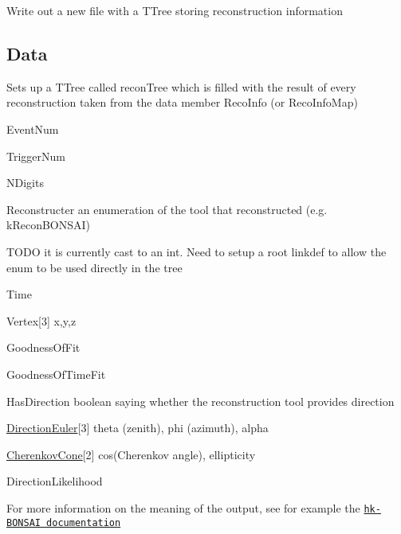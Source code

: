 Write out a new file with a {\ttfamily T\-Tree} storing reconstruction information

\subsection*{Data}


\begin{DoxyItemize}
\item Sets up a {\ttfamily T\-Tree} called {\ttfamily recon\-Tree} which is filled with the result of every reconstruction taken from the data member {\ttfamily Reco\-Info} (or {\ttfamily Reco\-Info\-Map})
\begin{DoxyItemize}
\item {\ttfamily Event\-Num}
\item {\ttfamily Trigger\-Num}
\end{DoxyItemize}
\end{DoxyItemize}

{\ttfamily N\-Digits}
\begin{DoxyItemize}
\item {\ttfamily Reconstructer} an enumeration of the tool that reconstructed (e.\-g. k\-Recon\-B\-O\-N\-S\-A\-I)
\begin{DoxyItemize}
\item T\-O\-D\-O it is currently cast to an int. Need to setup a root linkdef to allow the enum to be used directly in the tree
\end{DoxyItemize}
\item {\ttfamily Time}
\item {\ttfamily Vertex\mbox{[}3\mbox{]}} x,y,z
\item {\ttfamily Goodness\-Of\-Fit}
\item {\ttfamily Goodness\-Of\-Time\-Fit}
\item {\ttfamily Has\-Direction} boolean saying whether the reconstruction tool provides direction
\item {\ttfamily \hyperlink{structDirectionEuler}{Direction\-Euler}\mbox{[}3\mbox{]}} theta (zenith), phi (azimuth), alpha
\item {\ttfamily \hyperlink{structCherenkovCone}{Cherenkov\-Cone}\mbox{[}2\mbox{]}} cos(\-Cherenkov angle), ellipticity
\item {\ttfamily Direction\-Likelihood}
\end{DoxyItemize}

For more information on the meaning of the output, see for example the \href{https://github.com/hyperk/hk-BONSAI}{\tt hk-\/\-B\-O\-N\-S\-A\-I documentation}

